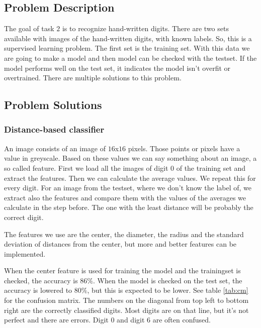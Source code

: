 \documentclass{article}
\begin{document}
\subsection{Problem Description}
The goal of task $2$ is to recognize hand-written digits. There are two sets available with images of the hand-written digits, with known labels. So, this is a supervised learning problem. The first set is the training set. With this data we are going to make a model and then model can be checked with the testset. If the model performs well on the test set, it indicates the model isn't overfit or overtrained. There are multiple solutions to this problem.

\subsection{Problem Solutions}
\subsubsection{Distance-based classifier}
An image consists of an image of $16$x$16$ pixels. Those points or pixels have a value in greyscale. Based on these values we can say something about an image, a so called feature. First we load all the images of digit $0$ of the training set and extract the features. Then we can calculate the average values. We repeat this for every digit. For an image from the testset, where we don't know the label of, we extract also the features and compare them with the values of the averages we calculate in the step before. The one with the least distance will be probably the correct digit.

The features we use are the center, the diameter, the radius and the standard deviation of distances from the center, but more and better features can be implemented. 

When the center feature is used for training the model and the trainingset is checked, the accuracy is $86\%$. When the model is checked on the test set, the accuracy is lowered to $80\%$, but this is expected to be lower. See table \ref{tab:cm} for the confusion matrix. The numbers on the diagonal from top left to bottom right are the correctly classified digits. Most digits are on that line, but it's not perfect and there are errors. Digit $0$ and digit $6$ are often confused. 
\end{document}
